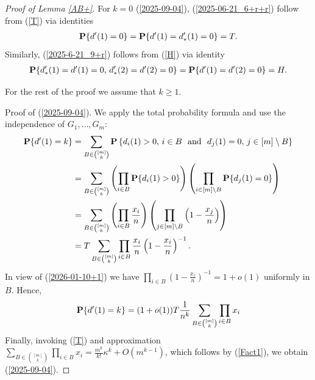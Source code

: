 \documentclass[10pt,a4paper]{amsart}
\newcommand{\PP}{{\bf{P}}}
\begin{document}
\begin{proof}[ Proof of Lemma \ref{AB+}]
For $k=0$ (\ref{2025-09-04}), (\ref{2025-06-21_6+r+r}) follow from (\ref{T}) via identities
\begin{align*}
\PP\{d'(1)=0\}
=
\PP\{d'(1)=d'_*(1)=0\}
= 
T.
\end{align*}
Similarly,  (\ref{2025-6-21_9+r}) follows from (\ref{H})
via identity
\begin{align*}
\PP\{d_*'(1)=d'(1)=0,\, d_*'(2)=d'(2)=0\}
=
\PP\{d'(1)=d'(2)=0\}=H.
\end{align*}

For the rest of the proof we assume that $k\ge 1$.



Proof of (\ref{2025-09-04}).
 We apply the total probability formula and use the independence of 
 $G_1,\dots, G_m$:
 \begin{align*}
 \PP\{d'(1)=k\}
&
=
\sum_{B\in\binom{[m]}{k}}
\PP
\left\{
d_i(1)>0,\, i\in B
\
\ 
{\text{and}}
\
\
d_j(1)=0, \, j \in[m]\setminus B
\right\}
\\
\nonumber
&
=
\sum_{B\in\binom{[m]}{k}}
\left(
\prod_{i\in B}
\PP\{d_i(1)>0\}
\right)
\left(
\prod_{i\in[m]\setminus B}
\PP\{d_j(1)=0\}
\right)
\\
\nonumber
&=
\sum_{B\in\binom{[m]}{k}}
\left(
\prod_{i\in B}
\frac{x_{i}}{n}
\right)
\left(
\prod_{j\in[m]\setminus B}
\left(
1
-
\frac{x_j}{n}
\right)
\right)
\\
&
=
T
\sum_{B\in\binom{[m]}{k}}
\prod_{i\in B}\frac{x_{i}}{n}
\left( 1-\frac{x_i}{n}\right)^{-1}.
\end{align*}
In view of (\ref{2026-01-10+1}) we 
have $\prod_{i\in B}
\left( 1-\frac{x_i}{n}\right)^{-1}=
1+o(1)$ uniformly 
in  $B$.
Hence,
 \begin{align*}
 \PP\{d'(1)=k\}
=
(1+o(1))
T\frac{1}{n^k}
\sum_{B\in\binom{[m]}{k}}
\prod_{i\in B}x_{i}
\end{align*}
Finally, 
invoking 
 (\ref{T}) and approximation 
$\sum_{B\in\binom{[m]}{k}}
\prod_{i\in B}x_{i}
=
\frac{m^k}{k!}\kappa^k+O(m^{k-1})$, which follows by 
(\ref{Fact1}),  we obtain 
 (\ref{2025-09-04}).


\end{proof}
\end{document}
